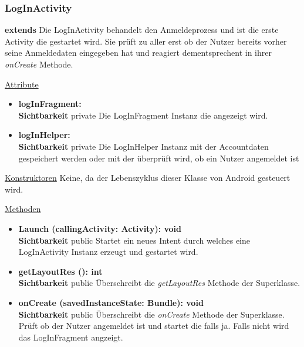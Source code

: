 \subsubsection{LogInActivity} \label{app:klasse:LogInActivity}
\textbf{extends} \newline
Die LogInActivity behandelt den Anmeldeprozess und ist die erste Activity die gestartet wird. Sie prüft zu aller erst ob der Nutzer bereits vorher seine Anmeldedaten eingegeben hat und reagiert dementsprechent in ihrer \textit{onCreate} Methode.
\newline

\underline{Attribute}
\begin{itemize}
\itemsep0pt
\item \textbf{logInFragment: } \hfill\\ 
\textbf{Sichtbarkeit} private\newline
Die LogInFragment Instanz die angezeigt wird.

\item \textbf{logInHelper: } \hfill\\ 
\textbf{Sichtbarkeit} private\newline
Die LogInHelper Instanz mit der Accountdaten gespeichert werden oder mit der überprüft wird, ob ein Nutzer angemeldet ist

\end{itemize}

\underline{Konstruktoren}\newline
\indent Keine, da der Lebenszyklus dieser Klasse von Android gesteuert wird.\newline

\underline{Methoden}
\begin{itemize}
\itemsep0pt

\item \textbf{Launch (callingActivity: Activity): void}\hfill\\
\textbf{Sichtbarkeit} public\newline
Startet ein neues Intent durch welches eine LogInActivity Instanz erzeugt und gestartet wird.

\item \textbf{getLayoutRes (): int}\hfill\\
\textbf{Sichtbarkeit} public\newline
Überschreibt die \textit{getLayoutRes} Methode der Superklasse.

\item \textbf{onCreate (savedInstanceState: Bundle): void}\hfill\\
\textbf{Sichtbarkeit} public\newline
Überschreibt die \textit{onCreate} Methode der Superklasse. Prüft ob der Nutzer angemeldet ist und startet die  falls ja. Falls nicht wird das LogInFragment angzeigt.

\end{itemize}